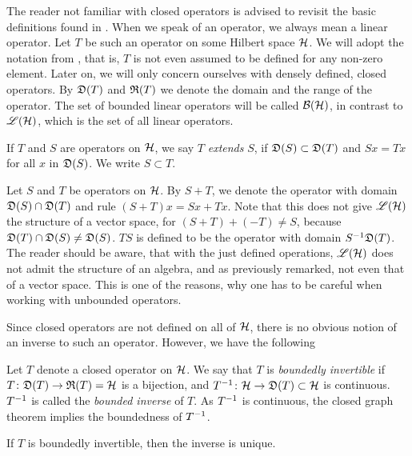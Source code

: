 The reader not familiar with closed operators is advised to revisit the
basic definitions found in \cite[Ch. 10]{ConFuncAna}.  When we speak of an
operator, we always mean a linear operator.
Let $T$ be such an operator on some Hilbert space $\mathcal{H}$.
We will adopt the notation from \cite[Ch. 10]{ConFuncAna}, that is, $T$ is not even
assumed to be defined for any non-zero element. Later on, we will only 
concern ourselves with densely defined, closed operators. By $\mathfrak{D}(T)$ and
$\mathfrak{R}(T)$ we denote the domain and the range
of the operator. The set of bounded linear operators will be
called $\mathcal{B}(\mathcal{H})$, in
contrast to $\mathscr{L}(\mathcal{H})$, which is the set of all linear operators.

\begin{defi}
  If $T$ and $S$ are operators on $\mathcal{H}$, we say $T$ \textit{extends} $S$,
  if $\mathfrak{D}(S)\subset
  \mathfrak{D}(T)$ and $ Sx = Tx$ for all $x$ in $ \mathfrak{D} (S)$. We write $S \subset T$.
\end{defi}

Let $S$ and $ T$ be operators on $\mathcal{H}$. By $S + T$,  we denote
the operator with domain 
$\mathfrak{D}(S) \cap \mathfrak{D}(T)$ and rule $(S + T)x = Sx + Tx$. Note that this does
not give $\mathscr{L}(\mathcal{H})$ the structure of a vector space, for 
$(S + T) +( - T) \neq S$, because
$\mathfrak{D}(T)\cap \mathfrak{D}(S) \neq \mathfrak{D}(S)$.
$TS$ is defined to be the operator with domain $S^{-1} \mathfrak{D}(T)$. The reader should
be aware, that with the just defined operations, $\mathscr{L}(\mathcal{H})$ does not admit the
structure of an algebra, and as previously remarked, not even that of a
vector space. This is one
of the reasons, why one has to be careful when working with unbounded
operators. 

Since closed operators are not defined on all of $\mathcal{H}$,
there is no obvious notion of an inverse to such an operator.
However, we have the following

\begin{defi}
 Let $T$ denote a closed operator on $\mathcal{H}$. We say that $T$ is 
 \textit{boundedly invertible} if
 $T\colon\mathfrak{D}(T) \to \mathfrak{R}(T)= \mathcal{H}$ is a bijection, and $T^{-1} \colon\mathcal{H} \to \mathfrak{D}(T) \subset \mathcal{H}$
 is continuous. $T^{-1}$ is called the \textit{bounded inverse} of $T$. As $T^{-1}$ is
 continuous, the closed graph theorem implies the boundedness of $T^{-1}$.
\end{defi}

\begin{rem}
 If $T$ is boundedly invertible, then the inverse is unique.
\end{rem}

% 
% 
% 

